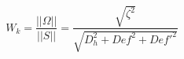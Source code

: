 \documentclass[10pt,a4paper]{article}
\begin{document}
$$W_k=\frac{||\Omega||}{||S||}=\frac{\sqrt{\zeta^2}}{\sqrt{D_h^2 + Def^2 + Def'^2}}$$
\end{document}
